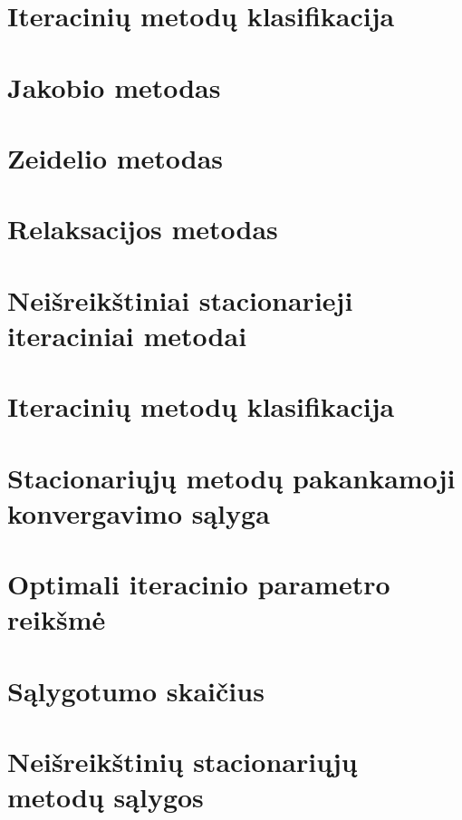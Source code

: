 \section{Iteracinių metodų klasifikacija}
\cite[104]{textbook}
\section{Jakobio metodas}
\cite[88-93]{textbook}
\section{Zeidelio metodas}
\cite[93-96]{textbook}
\section{Relaksacijos metodas}
\cite[96-100]{textbook}
\section{Neišreikštiniai stacionarieji iteraciniai metodai}
\cite[110-112]{textbook}
\section{Iteracinių metodų klasifikacija}
\cite[104]{textbook}
\section{Stacionariųjų metodų pakankamoji konvergavimo sąlyga}
\cite[105]{textbook}
\section{Optimali iteracinio parametro reikšmė}
\cite[106]{textbook}
\section{Sąlygotumo skaičius}
\cite[107]{textbook}
\section{Neišreikštinių stacionariųjų metodų sąlygos}
\cite[109]{textbook}


